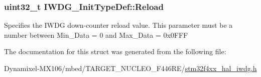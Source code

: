 \subsubsection[{\texorpdfstring{Reload}{Reload}}]{\setlength{\rightskip}{0pt plus 5cm}uint32\+\_\+t I\+W\+D\+G\+\_\+\+Init\+Type\+Def\+::\+Reload}\hypertarget{struct_i_w_d_g___init_type_def_af5a275e4c73292039258a0287fb7901d}{}\label{struct_i_w_d_g___init_type_def_af5a275e4c73292039258a0287fb7901d}
Specifies the I\+W\+DG down-\/counter reload value. This parameter must be a number between Min\+\_\+\+Data = 0 and Max\+\_\+\+Data = 0x0\+F\+FF 

The documentation for this struct was generated from the following file\+:\begin{DoxyCompactItemize}
\item 
Dynamixel-\/\+M\+X106/mbed/\+T\+A\+R\+G\+E\+T\+\_\+\+N\+U\+C\+L\+E\+O\+\_\+\+F446\+R\+E/\hyperlink{stm32f4xx__hal__iwdg_8h}{stm32f4xx\+\_\+hal\+\_\+iwdg.\+h}\end{DoxyCompactItemize}
